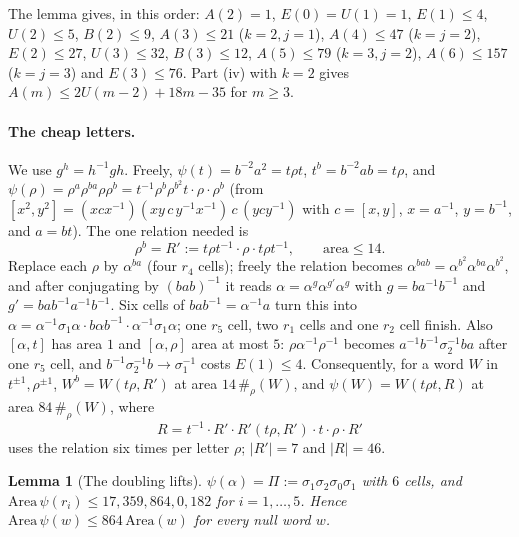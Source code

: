 \documentclass[11pt,a4paper]{article}
\theoremstyle{plain}
\newtheorem{lemma}[theorem]{Lemma}
\theoremstyle{definition}
\theoremstyle{remark}
\begin{document}
The lemma gives, in this order: $A(2)=1$, $E(0)=U(1)=1$, $E(1)\le4$, $U(2)\le5$, $B(2)\le9$, $A(3)\le21$ ($k=2,j=1$),
$A(4)\le47$ ($k=j=2$), $E(2)\le27$, $U(3)\le32$, $B(3)\le12$, $A(5)\le79$ ($k=3,j=2$), $A(6)\le157$ ($k=j=3$) and $E(3)\le76$.
Part (iv) with $k=2$ gives $A(m)\le2U(m-2)+18m-35$ for $m\ge3$.

\paragraph{The cheap letters.} We use $g^h=h^{-1}gh$. Freely, $\psi(t)=b^{-2}a^2=t\rho t$, $t^b=b^{-2}ab=t\rho$, and
$\psi(\rho)=\rho^a\rho^{ba}\rho\rho^b=t^{-1}\rho^b\rho^{b^2}t\cdot\rho\cdot\rho^b$ (from $[x^2,y^2]=(xcx^{-1})(xy\,c\,y^{-1}x^{-1})\,c\,(ycy^{-1})$ with
$c=[x,y]$, $x=a^{-1}$, $y=b^{-1}$, and $a=bt$). The one relation needed is
\[
\rho^b=R':=t\rho t^{-1}\cdot\rho\cdot t\rho t^{-1},\qquad\text{area}\le14 .
\]
Replace each $\rho$ by $\alpha^{ba}$ (four $r_4$ cells); freely the relation becomes $\alpha^{bab}=\alpha^{b^2}\alpha^{ba}\alpha^{b^2}$, and after
conjugating by $(bab)^{-1}$ it reads $\alpha=\alpha^g\alpha^{g'}\alpha^g$ with $g=ba^{-1}b^{-1}$ and $g'=bab^{-1}a^{-1}b^{-1}$. Six cells of
$bab^{-1}=\alpha^{-1}a$ turn this into $\alpha=\alpha^{-1}\sigma_1\alpha\cdot b\alpha b^{-1}\cdot\alpha^{-1}\sigma_1\alpha$; one $r_5$ cell, two $r_1$ cells
and one $r_2$ cell finish. Also $[\alpha,t]$ has area $1$ and $[\alpha,\rho]$ area at most $5$: $\rho\alpha^{-1}\rho^{-1}$ becomes
$a^{-1}b^{-1}\sigma_2^{-1}ba$ after one $r_5$ cell, and $b^{-1}\sigma_2^{-1}b\to\sigma_1^{-1}$ costs $E(1)\le4$. Consequently, for a word
$W$ in $t^{\pm1},\rho^{\pm1}$, $W^b=W(t\rho,R')$ at area $14\,\#_\rho(W)$, and $\psi(W)=W(t\rho t,R)$ at area $84\,\#_\rho(W)$, where
\[
R=t^{-1}\cdot R'\cdot R'(t\rho,R')\cdot t\cdot\rho\cdot R'
\]
uses the relation six times per letter $\rho$; $|R'|=7$ and $|R|=46$.

\begin{lemma}[The doubling lifts]\label{lem:psi}
$\psi(\alpha)=\Pi:=\sigma_1\sigma_2\sigma_0\sigma_1$ with $6$ cells, and $\mathrm{Area}\,\psi(r_i)\le17,359,864,0,182$ for $i=1,\dots,5$.
Hence $\mathrm{Area}\,\psi(w)\le864\,\mathrm{Area}(w)$ for every null word $w$.
\end{lemma}
\end{document}
